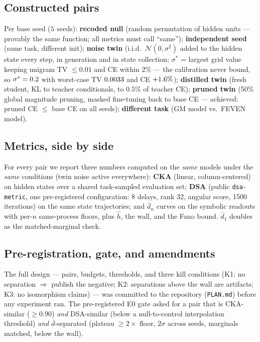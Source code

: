 \documentclass[11pt]{article}
\newcommand{\dbar}{\bar d}
\begin{document}
\subsection{Constructed pairs}
Per base seed ($5$ seeds): \textbf{recoded null} (random permutation of hidden
units --- provably the same function; all metrics must call ``same'');
\textbf{independent seed} (same task, different init); \textbf{noise twin} (i.i.d.\
$\mathcal N(0, \sigma^2)$ added to the hidden state every step, in generation and in
state collection; $\sigma^\ast$ = largest grid value keeping unigram TV $\le 0.01$
and CE within $2\%$ --- the calibration never bound, so $\sigma^\ast = 0.2$
with worst-case TV $0.0033$ and CE $+1.6\%$); \textbf{distilled twin}
(fresh student, KL to teacher conditionals, to $0.5\%$ of teacher CE); \textbf{pruned
twin} (50\% global magnitude pruning, masked fine-tuning back to base CE ---
achieved: pruned CE $\le$ base CE on all seeds); \textbf{different task} (GM model
vs.\ FEVEN model).

\subsection{Metrics, side by side}
For every pair we report three numbers computed on the \emph{same} models under the
\emph{same} conditions (twin noise active everywhere): \textbf{CKA} (linear,
column-centered) on hidden states over a shared task-sampled evaluation set;
\textbf{DSA} (public \texttt{dsa-metric}, one pre-registered configuration: 8 delays,
rank 32, angular score, 1500 iterations) on the same state trajectories; and
\textbf{$\dbar_n$} curves on the symbolic readouts with per-$n$ same-process floors,
plus $\hat h$, the wall, and the Fano bound. $\dbar_1$ doubles as the
matched-marginal check.

\subsection{Pre-registration, gate, and amendments}\label{sec:prereg}
The full design --- pairs, budgets, thresholds, and three kill conditions (K1: no
separation $\Rightarrow$ publish the negative; K2: separations above the wall are
artifacts; K3: no isomorphism claims) --- was committed to the repository
(\texttt{PLAN.md}) before any experiment ran. The pre-registered E0 gate asked for a
pair that is CKA-similar ($\ge 0.90$) \emph{and} DSA-similar (below a
null-to-control interpolation threshold) \emph{and} $\dbar$-separated (plateau
$\ge 2\times$ floor, $2\sigma$ across seeds, marginals matched, below the wall).
\end{document}

